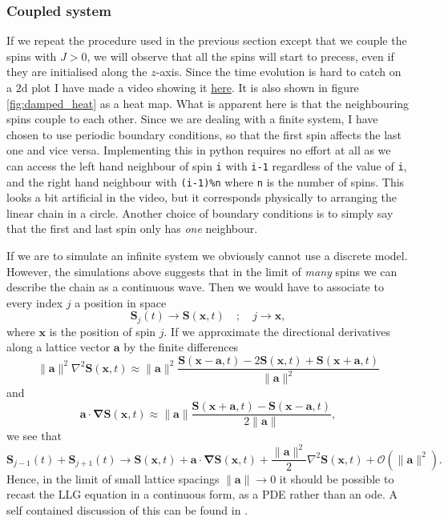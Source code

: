 \subsubsection{Coupled system}

If we repeat the procedure used in the previous section except that we couple the spins with $J > 0$, we will observe that all the spins will start to precess, even if they are initialised along the $z$-axis. Since the time evolution is hard to catch on a $2\mathrm{d}$ plot I have made a video showing it \href{https://folk.ntnu.no/sondrdl/spinwaves/coupled.mp4}{here}. It is also shown in figure \ref{fig:damped_heat} as a heat map. What is apparent here is that the neighbouring spins couple to each other. Since we are dealing with a finite system, I have chosen to use periodic boundary conditions, so that the first spin affects the last one and vice versa. Implementing this in python requires no effort at all as we can access the left hand neighbour of spin \texttt{i} with \texttt{i-1} regardless of the value of \texttt{i}, and the right hand neighbour with \texttt{(i-1)\%n} where \texttt{n} is the number of spins. This looks a bit artificial in the video, but it corresponds physically to arranging the linear chain in a circle. Another choice of boundary conditions is to simply say that the first and last spin only has \textit{one} neighbour. 


If we are to simulate an infinite system we obviously cannot use a discrete model. However, the simulations above suggests that in the limit of \textit{many} spins we can describe the chain as a continuous wave. Then we would have to associate to every index $j$ a position in space 
$$
	\mathbf{S}_j(t) \to \mathbf{S}(\mathbf{x},t) \quad ; \quad j \to \mathbf{x},
$$
where $\mathbf{x}$ is the position of spin $j$.
If we approximate the directional derivatives along a lattice vector $\mathbf{a}$ by the finite differences 
$$
	 \|\mathbf{a}\|^2  \nabla^2 \mathbf{S}(\mathbf{x},t) \approx \|\mathbf{a}\|^2 \frac{\mathbf{S}(\mathbf{x} - \mathbf{a},t) - 2 \mathbf{S}(\mathbf{x},t) + \mathbf{S}(\mathbf{x} + \mathbf{a},t) }{ \| \mathbf{a} \|^2}
$$
and 
$$
	\mathbf{a} \cdot \boldsymbol{\nabla} \mathbf{S}(\mathbf{x},t) \approx \|\mathbf{a}\| \frac{\mathbf{S}(\mathbf{x}+\mathbf{a},t) - \mathbf{S}(\mathbf{x}-\mathbf{a},t)}{2\|\mathbf{a}\|},
$$
we see that 
$$
	\mathbf{S}_{j-1}(t) + \mathbf{S}_{j+1}(t) \to \mathbf{S}(\mathbf{x},t) + \mathbf{a} \cdot \boldsymbol{\nabla} \mathbf{S}(\mathbf{x},t) + \frac{\| \mathbf{a} \|^2}{2} \nabla^2 \mathbf{S}(\mathbf{x},t) + \mathcal{O}(\|\mathbf{a}\|^2).
$$
Hence, in the limit of small lattice spacings $\|\mathbf{a}\| \to 0$ it should be possible to recast the LLG equation in a continuous form, as a PDE rather than an ode. A self contained discussion of this can be found in \cite{Lakshmanan2011}.

